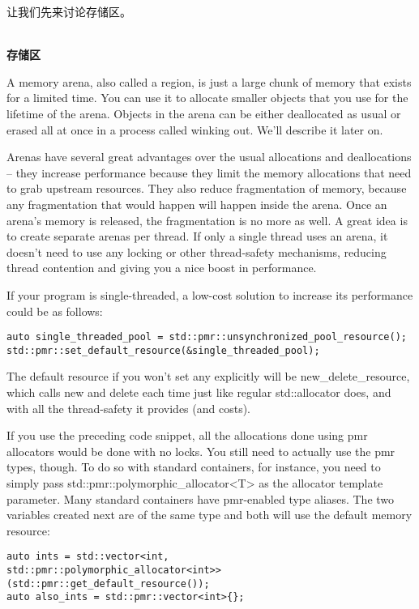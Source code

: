 让我们先来讨论存储区。

\hspace*{\fill} \\ %
\noindent
\textbf{存储区}

A memory arena, also called a region, is just a large chunk of memory that exists for a limited time. You can use it to allocate smaller objects that you use for the lifetime of the arena. Objects in the arena can be either deallocated as usual or erased all at once in a process called winking out. We'll describe it later on.

Arenas have several great advantages over the usual allocations and deallocations – they increase performance because they limit the memory allocations that need to grab upstream resources. They also reduce fragmentation of memory, because any fragmentation that would happen will happen inside the arena. Once an arena's memory is released, the fragmentation is no more as well. A great idea is to create separate arenas per thread. If only a single thread uses an arena, it doesn't need to use any locking or other thread-safety mechanisms, reducing thread contention and giving you a nice boost in performance.

If your program is single-threaded, a low-cost solution to increase its performance could be as follows:

\begin{lstlisting}[style=styleCXX]
auto single_threaded_pool = std::pmr::unsynchronized_pool_resource();
std::pmr::set_default_resource(&single_threaded_pool);
\end{lstlisting}

The default resource if you won't set any explicitly will be new\_delete\_resource, which calls new and delete each time just like regular std::allocator does, and with all the thread-safety it provides (and costs).

If you use the preceding code snippet, all the allocations done using pmr allocators would be done with no locks. You still need to actually use the pmr types, though. To do so with standard containers, for instance, you need to simply pass std::pmr::polymorphic\_allocator<T> as the allocator template parameter. Many standard containers have pmr-enabled type aliases. The two variables created next are of the same type and both will use the default memory resource:

\begin{lstlisting}[style=styleCXX]
auto ints = std::vector<int,
std::pmr::polymorphic_allocator<int>>(std::pmr::get_default_resource());
auto also_ints = std::pmr::vector<int>{};
\end{lstlisting}

